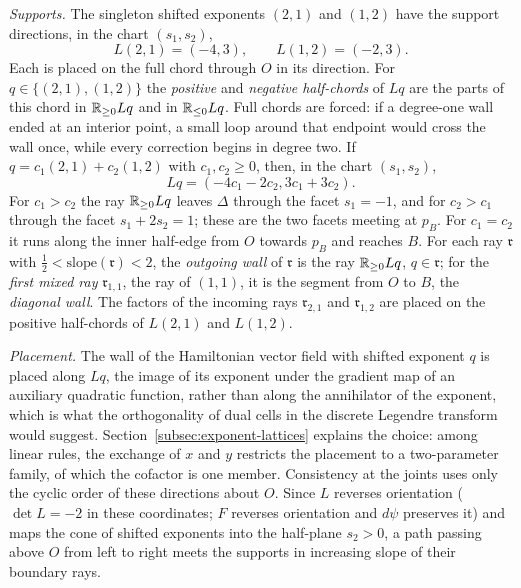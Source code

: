 \emph{Supports.}  The singleton shifted exponents $(2,1)$ and $(1,2)$ have
the support directions, in the chart $(s_1,s_2)$,
\begin{equation}\label{eq:cofactor-singletons}
 L(2,1)=(-4,3),
 \qquad L(1,2)=(-2,3).
\end{equation}
Each is placed on the full chord through $O$ in its direction.  For
$q\in\{(2,1),(1,2)\}$ the \emph{positive} and \emph{negative half-chords} of
$Lq$ are the parts of this chord in $\mathbb R_{\geq0}Lq$ and in $\mathbb R_{\leq0}Lq$.
Full chords are forced: if a degree-one wall ended at an interior point, a
small loop around that endpoint would cross the wall once, while every
correction begins in degree two.  If $q=c_1(2,1)+c_2(1,2)$ with
$c_1,c_2\geq0$, then, in the chart $(s_1,s_2)$,
\begin{equation}\label{eq:outgoing-cofactor}
 Lq=(-4c_1-2c_2,3c_1+3c_2).
\end{equation}
For $c_1>c_2$ the ray $\mathbb R_{\geq0}Lq$ leaves $\Delta$ through the facet
$s_1=-1$, and for $c_2>c_1$ through the facet $s_1+2s_2=1$; these are
the two facets meeting at $p_B$.  For $c_1=c_2$ it runs along the inner
half-edge from $O$ towards $p_B$ and reaches $B$.  For each ray
$\mathfrak r$ with $\frac12<\mathrm{slope}(\mathfrak r)<2$, the
\emph{outgoing wall} of $\mathfrak r$ is the ray $\mathbb R_{\geq0}Lq$,
$q\in\mathfrak r$; for the \emph{first mixed ray} $\mathfrak r_{1,1}$, the ray
of $(1,1)$, it is the segment from $O$ to $B$, the \emph{diagonal wall}.
The factors of the incoming rays $\mathfrak r_{2,1}$ and $\mathfrak r_{1,2}$
are placed on the positive half-chords of $L(2,1)$ and $L(1,2)$.

\emph{Placement.}  The wall of the Hamiltonian vector field with shifted
exponent $q$ is
placed along $Lq$, the image of its exponent under the gradient map of an
auxiliary quadratic function, rather than along the annihilator of the
exponent, which is what the orthogonality of dual cells in the discrete
Legendre transform would suggest.  Section~\ref{subsec:exponent-lattices}
explains the choice: among linear rules, the exchange of $x$ and $y$ restricts
the placement to a two-parameter family, of which the cofactor is one member.
Consistency at the joints uses only the cyclic order of these directions
about $O$.  Since $L$ reverses orientation ($\det L=-2$ in these coordinates;
$F$ reverses orientation and $d\psi$ preserves it) and maps the cone of shifted exponents into the half-plane $s_2>0$, a path
passing above $O$ from left to right meets the supports in increasing slope
of their boundary rays.

